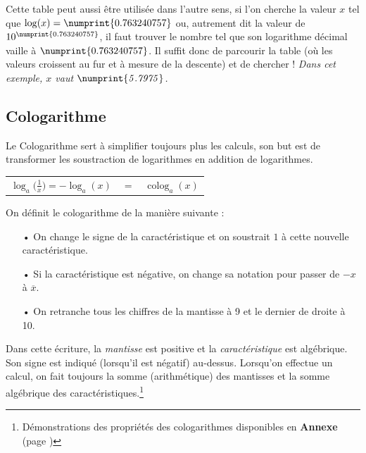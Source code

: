 \documentclass[a4paper]{article}
\begin{document}
\vspace{0.3 cm}

Cette table peut aussi être utilisée dans l'autre sens, si l'on cherche la valeur $x$ tel que $\log(x) = \numprint{0.763 240 757}$ ou, autrement dit la valeur de $10^{\numprint{0.763 240 757}}$, il faut trouver le nombre tel que son logarithme décimal vaille à $\numprint{0.763 240 757}$. Il suffit donc de parcourir la table (où les valeurs croissent au fur et à mesure de la descente) et de chercher ! \textit{Dans cet exemple, $\mathit{x}$ vaut $\mathit{\numprint{5.7975}}$.}

\vspace{0.2 cm}

\subsection{Cologarithme}

Le Cologarithme sert à simplifier toujours plus les calculs, son but est de transformer les soustraction de logarithmes en addition de logarithmes.

\begin{center}
\begin{tabular}{ccl}

	$ \log_a \Big( \frac{1}{x} \Big) = - \log_a (x) $ & $ = $ & $\operatorname{colog}_a (x) $ \\
	
\end{tabular}
\end{center}

On définit le cologarithme de la manière suivante :
\begin{itemize}
	\item[•] On change le signe de la caractéristique et on soustrait $1$ à cette nouvelle caractéristique.
	\item[•] Si la caractéristique est négative, on change sa notation pour passer de $-x$ à $\overline{x}$. 
	\item[•] On retranche tous les chiffres de la mantisse à 9 et le dernier de droite à 10.
\end{itemize}

\vspace{2 mm}

Dans cette écriture, la \textit{mantisse} est positive et la \textit{caractéristique} est algébrique. Son signe est indiqué (lorsqu'il est négatif) au-dessus. Lorsqu'on effectue un calcul, on fait toujours la somme (arithmétique) des mantisses et la somme algébrique des caractéristiques.\footnote{Démonstrations des propriétés des cologarithmes disponibles en \textbf{Annexe} (page \pageref{demo_colog})}
\end{document}
